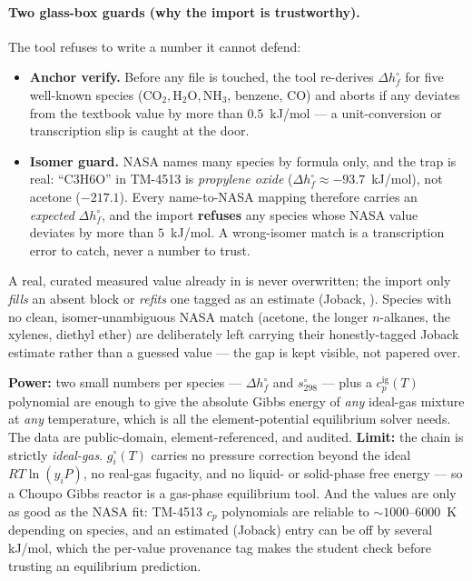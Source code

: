 \documentclass[11pt,a4paper]{article}
\begin{document}
\paragraph{Two glass-box guards (why the import is trustworthy).}
The tool refuses to write a number it cannot defend:
\begin{itemize}[leftmargin=*]
  \item \textbf{Anchor verify.}  Before any file is touched, the tool
        re-derives $\Delta h^{\circ}_f$ for five well-known species
        ($\mathrm{CO_2}, \mathrm{H_2O}, \mathrm{NH_3}$, benzene,
        $\mathrm{CO}$) and aborts if any deviates from the textbook
        value by more than $0.5$~kJ/mol --- a unit-conversion or
        transcription slip is caught at the door.
  \item \textbf{Isomer guard.}  NASA names many species by formula only,
        and the trap is real: ``C3H6O'' in TM-4513 is \emph{propylene
        oxide} ($\Delta h^{\circ}_f \approx -93.7$~kJ/mol), not acetone
        ($-217.1$).  Every name-to-NASA mapping therefore carries an
        \emph{expected} $\Delta h^{\circ}_f$, and the import \textbf{refuses}
        any species whose NASA value deviates by more than $5$~kJ/mol.
        A wrong-isomer match is a transcription error to catch, never a
        number to trust.
\end{itemize}
A real, curated measured value already in
 is never overwritten; the import only
\emph{fills} an absent block or \emph{refits} one tagged as an estimate
(Joback, ).  Species with no clean,
isomer-unambiguous NASA match (acetone, the longer $n$-alkanes, the
xylenes, diethyl ether) are deliberately left carrying their
honestly-tagged Joback estimate rather than a guessed value --- the gap
is kept visible, not papered over.

\begin{intuition}
\textbf{Power:} two small numbers per species --- $\Delta h^{\circ}_f$
and $s^{\circ}_{298}$ --- plus a $c_p^{\mathrm{ig}}(T)$ polynomial are
enough to give the absolute Gibbs energy of \emph{any} ideal-gas mixture
at \emph{any} temperature, which is all the element-potential equilibrium
solver needs.  The data are public-domain, element-referenced, and
audited.  \textbf{Limit:} the chain is strictly \emph{ideal-gas}.
$g^{\circ}_i(T)$ carries no pressure correction beyond the ideal
$RT\ln(y_iP)$, no real-gas fugacity, and no liquid- or solid-phase
free energy --- so a Choupo Gibbs reactor is a gas-phase equilibrium
tool.  And the values are only as good as the NASA fit: TM-4513
$c_p$ polynomials are reliable to $\sim 1000$--$6000$~K depending on
species, and an estimated (Joback) entry can be off by several kJ/mol,
which the per-value provenance tag makes the student check before
trusting an equilibrium prediction.
\end{intuition}
\end{document}
